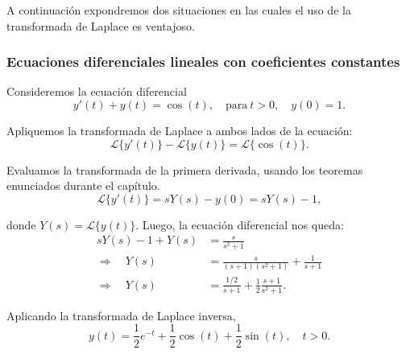 A continuación expondremos dos situaciones en las cuales el uso de la transformada de Laplace es ventajoso.

\subsubsection{Ecuaciones diferenciales lineales con coeficientes constantes}

\begin{ejemplo}
    Consideremos la ecuación diferencial
    $$y'(t) + y(t) = \cos(t), \quad \text{para} ~ t > 0, \quad y(0) = 1.$$

    Apliquemos la transformada de Laplace a ambos lados de la ecuación:
    $$\mathcal{L}\{y'(t)\} - \mathcal{L}\{y(t)\} = \mathcal{L}\{\cos(t)\}.$$

    Evaluamos la transformada de la primera derivada, usando los teoremas enunciados durante el capítulo.
    $$\mathcal{L}\{y'(t)\} = s Y(s) - y(0) = s Y(s) - 1,$$

    donde $Y(s) = \mathcal{L}\{y(t)\}$. Luego, la ecuación diferencial nos queda:
    \begin{align*}
        sY(s) - 1 + Y(s) &= \frac{s}{s^2+1} \\
        \Rightarrow \quad Y(s) &= \frac{s}{(s+1)(s^2+1)} + \frac{1}{s+1} \\
        \Rightarrow \quad Y(s) &= \frac{1/2}{s+1} + \frac{1}{2} \frac{s+1}{s^2+1}.
    \end{align*}

    Aplicando la transformada de Laplace inversa,
    $$y(t) = \frac{1}{2} e^{-t} + \frac{1}{2} \cos(t) + \frac{1}{2} \sin(t), \quad t > 0.$$
\end{ejemplo}





